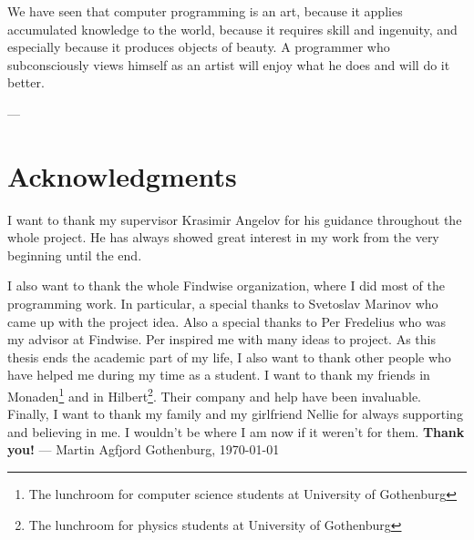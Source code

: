 
\vspace{30mm}
\begin{flushleft}{\slshape

We have seen that computer programming is an art, because it applies accumulated knowledge to the world, because it requires skill and ingenuity, and especially
    because it produces objects of beauty. A programmer who
    subconsciously views himself as an artist will enjoy what he does and will do it better.} \medskip
\end{flushleft}
\begin{flushright}
---  \citep{knuth:1974}
\end{flushright}



\bigskip

\begingroup
\let\clearpage\relax
\let\cleardoublepage\relax
\let\cleardoublepage\relax
\chapter*{Acknowledgments}
I want to thank my supervisor Krasimir Angelov for his guidance throughout the whole project. He has always showed great interest in my work from the very beginning until the end. 

I also want to thank the whole Findwise organization, where I did most of the programming work. In particular, a special thanks to Svetoslav Marinov who came up with the project idea. Also a special thanks to Per Fredelius who was my advisor at Findwise. Per inspired me with many ideas to project. 
\newline
\newline
As this thesis ends the academic part of my life, I also want to thank other people who have helped me during my time as a student.
\newline
\newline
I want to thank my friends in Monaden\footnote{The lunchroom for computer science students at University of Gothenburg} and in Hilbert\footnote{The lunchroom for physics students at University of Gothenburg}. Their company and help have been invaluable.
\newline
\newline
Finally, I want to thank my family and my girlfriend Nellie for always supporting and believing in me. I wouldn't be where I am now if it weren't for them.
\newline
\newline
\newline
\newline
\textbf{Thank you!}
\newline
\newline
---
\newline
Martin Agfjord
\newline
Gothenburg, \today
\endgroup



